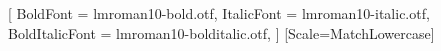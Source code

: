 
\usepackage{fontspec}
\setmainfont{lmroman10-regular.otf}[
  BoldFont       = lmroman10-bold.otf,
  ItalicFont     = lmroman10-italic.otf,
  BoldItalicFont = lmroman10-bolditalic.otf,
]
\setmonofont{lmmono10-regular.otf}[Scale=MatchLowercase]

\usepackage{unicode-math}

\usepackage{amsmath}
\usepackage{booktabs}
\usepackage{microtype}

\usepackage{etoolbox}


\usepackage[font=small]{caption}
\captionsetup{skip=4pt}
